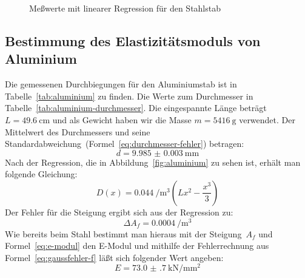 \begin{figure}
  \centering
  \caption{Meßwerte mit linearer Regression für den Stahlstab}
  \label{fig:stahl}
\end{figure}

\subsection{Bestimmung des Elastizitätsmoduls von Aluminium}

Die gemessenen Durchbiegungen für den Aluminiumstab ist in
Tabelle~\ref{tab:aluminium} zu finden. Die Werte zum Durchmesser in
Tabelle~\ref{tab:aluminium-durchmesser}. Die eingespannte Länge beträgt
$L=\SI{49.6}{\centi\metre}$ und als Gewicht haben wir die Masse
$m=\SI{5416}{\gram}$ verwendet. Der Mittelwert des Durchmessers und
seine Standardabweichung~(Formel~\eqref{eq:durchmesser-fehler}) betragen:
%
\begin{equation}
  d = \SI{9.985(3)}{\milli\metre}
\end{equation}
%
Nach der Regression, die in Abbildung~\ref{fig:aluminium} zu sehen ist,
erhält man folgende Gleichung:
%
\begin{equation}
  D(x) = \SI{0.044}{\per\cubic\metre} \left(Lx^2 - \frac{x^3}{3}\right)
\end{equation}
%
Der Fehler für die Steigung ergibt sich aus der Regression zu:
%
\begin{equation}
  \Delta A_f = \SI{0.0004}{\per\cubic\metre}
\end{equation}
%
Wie bereits beim Stahl bestimmt man hieraus mit der Steigung~$A_f$ und
Formel~\eqref{eq:e-modul} den E-Modul und mithilfe der Fehlerrechnung
aus Formel~\eqref{eq:gaussfehler-f} läßt sich folgender Wert angeben:
%
\begin{equation}
  E = \SI{73.0(7)}{\kilo\newton\per\milli\metre\squared}  
\end{equation}

